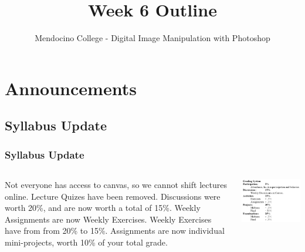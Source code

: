 \documentclass{beamer}
\title{Week 6 Outline}
\author{Mendocino College - Digital Image Manipulation with Photoshop}
\date{\vspace{-5em}}
\begin{document}
	{
		\begin{frame}
			\vspace{-35pt}
			\maketitle
		\end{frame}
	}

		\section{Announcements}
			\subsection{Syllabus Update}		
			\begin{frame}
				\frametitle{Syllabus Update}
				\begin{columns}
					\column{.6\textwidth}
					\begin{outline}
						\1 Not everyone has access to canvas, so we cannot shift lectures online.
						\1 Lecture Quizes have been removed.
						\1 Discussions were worth 20\%, and are now worth a total of 15\%.
						\1 Weekly Assignments are now Weekly Exercises.
						\1 Weekly Exercises have from from 20\% to 15\%.
						\1 Assignments are now individual mini-projects, worth 10\% of your total grade.
					\end{outline}
					\column{.5\textwidth}
					\includegraphics[width=1.0\textwidth]{images/grading system update.png}
				\end{columns}
			\end{frame}
\end{document}
